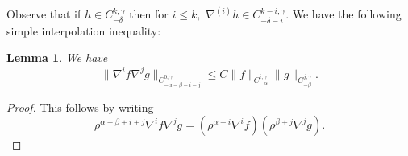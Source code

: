 \documentclass[12pt]{amsart}
\renewcommand{\1}{{\mathbf 1}}
\newtheorem{lemma}[thm]{Lemma}
\theoremstyle{others}
\numberwithin{equation}{section}
\begin{document}
Observe that if $h \in C^{k,\gamma}_{-\delta}$ then for $i \leq k,$ $\nabla^{(i)} h \in C^{k - i,\gamma}_{-\delta - i}.$
We have the following simple interpolation inequality:






\begin{lemma}\label{lemma:interpolation} We have
\begin{equation}
    \|\nabla^{i}f \nabla^{j} g \|_{C^{0,\gamma}_{-\alpha -\beta - i - j}} \leq C \|f \|_{C^{i,\gamma}_{-\alpha }} \|g \|_{C^{j,\gamma}_{-\beta}}.
    \end{equation}
\end{lemma}
\begin{proof}
    This follows by writing
    $$\rho^{\alpha + \beta + i + j} \nabla^{i}f \nabla^{j} g = \left( \rho^{\alpha + i } \nabla^{i} f \right) \left( \rho^{\beta + j } \nabla^{j} g \right).$$
\end{proof}
\end{document}
